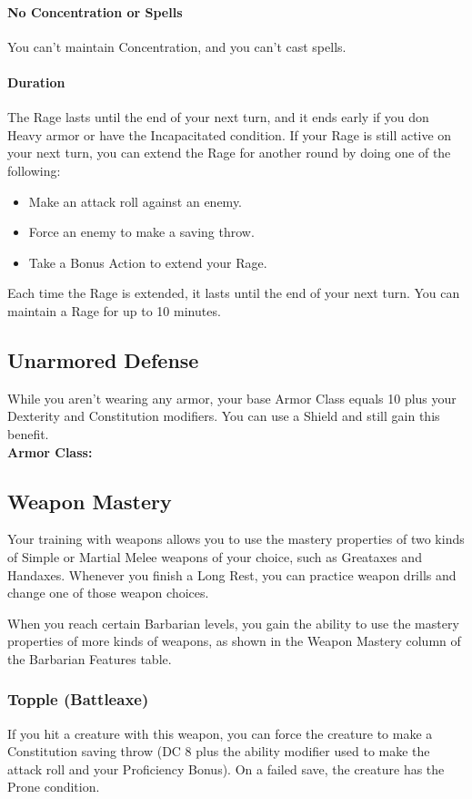 \documentclass[letterpaper,openany,oneside,twocolumn]{book}
\begin{document}
\paragraph*{No Concentration or Spells} You can't maintain Concentration, and you can't cast spells.

\paragraph*{Duration} The Rage lasts until the end of your next turn, and it ends early if you don Heavy armor or have the Incapacitated condition. If your Rage is still active on your next turn, you can extend the Rage for another round by doing one of the following:
\begin{itemize}
	\item Make an attack roll against an enemy.
	\item Force an enemy to make a saving throw.
	\item Take a Bonus Action to extend your Rage.
\end{itemize}

Each time the Rage is extended, it lasts until the end of your next turn. You can maintain a Rage for up to 10 minutes.
\subsection*{Unarmored Defense}
While you aren't wearing any armor, your base Armor Class equals 10 plus your Dexterity and Constitution modifiers. You can use a Shield and still gain this benefit.\\
\textbf{Armor Class: }
\subsection*{Weapon Mastery}
Your training with weapons allows you to use the mastery properties of two kinds of Simple or Martial Melee weapons of your choice, such as Greataxes and Handaxes. Whenever you finish a Long Rest, you can practice weapon drills and change one of those weapon choices.

When you reach certain Barbarian levels, you gain the ability to use the mastery properties of more kinds of weapons, as shown in the Weapon Mastery column of the Barbarian Features table.
\subsubsection*{Topple (Battleaxe)}
If you hit a creature with this weapon, you can force the creature to make a Constitution saving throw (DC 8 plus the ability modifier used to make the attack roll and your Proficiency Bonus). On a failed save, the creature has the Prone condition.
\end{document}
